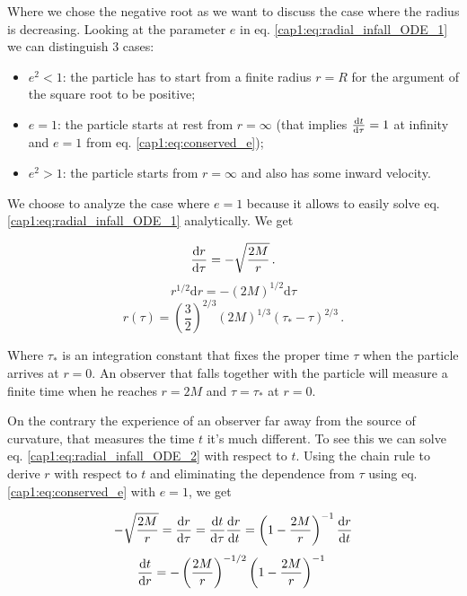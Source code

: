 Where we chose the negative root as we want to discuss the case where the radius
is decreasing.
Looking at the parameter $e$ in eq. \ref{cap1:eq:radial_infall_ODE_1} we can
distinguish 3 cases:

\begin{itemize}
    \item $e^2 < 1$: the particle has to start from a finite radius $r = R$
        for the argument of the square root to be positive;
    \item $e = 1$: the particle starts at rest from $r = \infty$ (that implies
        $\dv{t}{\tau} = 1$ at infinity and $e = 1$ from eq.
        \ref{cap1:eq:conserved_e});
    \item $e^2 > 1$: the particle starts from $r = \infty$ and also has some
        inward velocity.
\end{itemize}

We choose to analyze the case where $e = 1$ because it allows to easily solve
eq. \ref{cap1:eq:radial_infall_ODE_1} analytically.
We get

\begin{equation}
    \dv{r}{\tau} = - \sqrt{\frac{2 M}{r}} \, .
    \label{cap1:eq:radial_infall_ODE_2}
\end{equation}
\begin{equation*}
    r^{1/2} \mathrm{d}r = -(2M)^{1/2} \mathrm{d}\tau
\end{equation*}
\begin{equation}
    r(\tau) = \left(\frac{3}{2}\right)^{2/3}
    (2M)^{1/3} (\tau_* - \tau)^{2/3} \, .
    \label{cap1:eq:radial_infall_r_of_tau}
\end{equation}

Where $\tau_*$ is an integration constant that fixes the proper time $\tau$
when the particle arrives at $r = 0$.
An observer that falls together with the particle will measure a finite time
when he reaches $r = 2M$ and $\tau = \tau_*$ at $r = 0$.

On the contrary the experience of an observer far away from the source of
curvature, that measures the \Sh time $t$ it's much different.
To see this we can solve eq. \ref{cap1:eq:radial_infall_ODE_2} with respect to
$t$.
Using the chain rule to derive $r$ with respect to $t$ and eliminating the
dependence from $\tau$ using eq. \ref{cap1:eq:conserved_e} with $e = 1$, we get

\begin{align*}
    - \sqrt{\frac{2 M}{r}} = \dv{r}{\tau} = \dv{t}{\tau} \dv{r}{t}
    = \left(1 - \frac{2M}{r} \right)^{-1} \dv{r}{t}
\end{align*}
\begin{equation*}
    \dv{t}{r} = - \left(\frac{2 M}{r}\right)^{-1/2}
    \left(1 - \frac{2M}{r} \right)^{-1} \,  \, 
\end{equation*}

